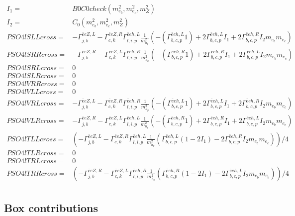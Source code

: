 \documentclass[A4,landscape]{article}
\begin{document}
\begin{align} 
I_1= & B0C0check(m^2_{e_{{b}}}, m^2_{e_{{c}}}, m^2_{Z}) \\ 
I_2= & C_0(m^2_{e_{{b}}}, m^2_{e_{{c}}}, m^2_{Z}) \\ 
  PSO4lSLLcross= &  - \Gamma^{\bar{e}e Z ,L} _{j, b} - \Gamma^{\bar{e}e Z ,R} _{c, k} \Gamma^{\bar{e}e h ,L}_{l, i, p} \frac{1}{m^2_{h_{{p}}}} (-(\Gamma^{\bar{e}e h ,L}_{b, c, p} 1) + 2 \Gamma^{\bar{e}e h ,L}_{b, c, p} I_1 + 2 \Gamma^{\bar{e}e h ,R}_{b, c, p} I_2 m_{e_{{b}}} m_{e_{{c}}}) \\ 
  PSO4lSRRcross= &  - \Gamma^{\bar{e}e Z ,R} _{j, b} - \Gamma^{\bar{e}e Z ,L} _{c, k} \Gamma^{\bar{e}e h ,R}_{l, i, p} \frac{1}{m^2_{h_{{p}}}} (-(\Gamma^{\bar{e}e h ,R}_{b, c, p} 1) + 2 \Gamma^{\bar{e}e h ,R}_{b, c, p} I_1 + 2 \Gamma^{\bar{e}e h ,L}_{b, c, p} I_2 m_{e_{{b}}} m_{e_{{c}}}) \\ 
  PSO4lSRLcross= & 0 \\ 
  PSO4lSLRcross= & 0 \\ 
  PSO4lVRRcross= & 0 \\ 
  PSO4lVLLcross= & 0 \\ 
  PSO4lVRLcross= &  - \Gamma^{\bar{e}e Z ,L} _{j, b} - \Gamma^{\bar{e}e Z ,R} _{c, k} \Gamma^{\bar{e}e h ,R}_{l, i, p} \frac{1}{m^2_{h_{{p}}}} (-(\Gamma^{\bar{e}e h ,L}_{b, c, p} 1) + 2 \Gamma^{\bar{e}e h ,L}_{b, c, p} I_1 + 2 \Gamma^{\bar{e}e h ,R}_{b, c, p} I_2 m_{e_{{b}}} m_{e_{{c}}}) \\ 
  PSO4lVLRcross= &  - \Gamma^{\bar{e}e Z ,R} _{j, b} - \Gamma^{\bar{e}e Z ,L} _{c, k} \Gamma^{\bar{e}e h ,L}_{l, i, p} \frac{1}{m^2_{h_{{p}}}} (-(\Gamma^{\bar{e}e h ,R}_{b, c, p} 1) + 2 \Gamma^{\bar{e}e h ,R}_{b, c, p} I_1 + 2 \Gamma^{\bar{e}e h ,L}_{b, c, p} I_2 m_{e_{{b}}} m_{e_{{c}}}) \\ 
  PSO4lTLLcross= & ( - \Gamma^{\bar{e}e Z ,L} _{j, b} - \Gamma^{\bar{e}e Z ,R} _{c, k} \Gamma^{\bar{e}e h ,L}_{l, i, p} \frac{1}{m^2_{h_{{p}}}} (\Gamma^{\bar{e}e h ,L}_{b, c, p} (1 - 2 I_1) - 2 \Gamma^{\bar{e}e h ,R}_{b, c, p} I_2 m_{e_{{b}}} m_{e_{{c}}}))/4 \\ 
  PSO4lTLRcross= & 0 \\ 
  PSO4lTRLcross= & 0 \\ 
  PSO4lTRRcross= & ( - \Gamma^{\bar{e}e Z ,R} _{j, b} - \Gamma^{\bar{e}e Z ,L} _{c, k} \Gamma^{\bar{e}e h ,R}_{l, i, p} \frac{1}{m^2_{h_{{p}}}} (\Gamma^{\bar{e}e h ,R}_{b, c, p} (1 - 2 I_1) - 2 \Gamma^{\bar{e}e h ,L}_{b, c, p} I_2 m_{e_{{b}}} m_{e_{{c}}}))/4 \\ 
\end{align} 
\subsection{Box contributions} 
\end{document}

